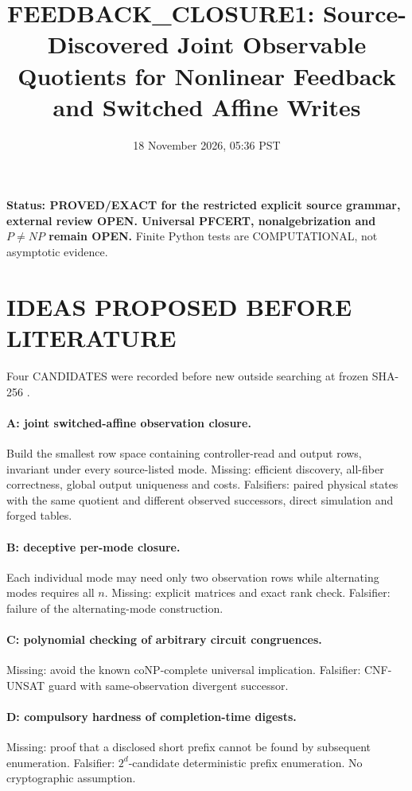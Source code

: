\documentclass[11pt]{article}
\title{FEEDBACK\_CLOSURE1: Source-Discovered Joint Observable Quotients for Nonlinear Feedback and Switched Affine Writes}
\date{18 November 2026, 05:36 PST}
\begin{document}
\maketitle
\noindent\textbf{Status: PROVED/EXACT for the restricted explicit source grammar, external review OPEN. Universal PFCERT, nonalgebrization and $P\ne NP$ remain OPEN.} Finite Python tests are COMPUTATIONAL, not asymptotic evidence.

\section{IDEAS PROPOSED BEFORE LITERATURE}
Four CANDIDATES were recorded before new outside searching at frozen SHA-256 .
\paragraph{A: joint switched-affine observation closure.} Build the smallest row space containing controller-read and output rows, invariant under every source-listed mode. Missing: efficient discovery, all-fiber correctness, global output uniqueness and costs. Falsifiers: paired physical states with the same quotient and different observed successors, direct simulation and forged tables.
\paragraph{B: deceptive per-mode closure.} Each individual mode may need only two observation rows while alternating modes requires all $n$. Missing: explicit matrices and exact rank check. Falsifier: failure of the alternating-mode construction.
\paragraph{C: polynomial checking of arbitrary circuit congruences.} Missing: avoid the known coNP-complete universal implication. Falsifier: CNF-UNSAT guard with same-observation divergent successor.
\paragraph{D: compulsory hardness of completion-time digests.} Missing: proof that a disclosed short prefix cannot be found by subsequent enumeration. Falsifier: $2^d$-candidate deterministic prefix enumeration. No cryptographic assumption.
\end{document}
